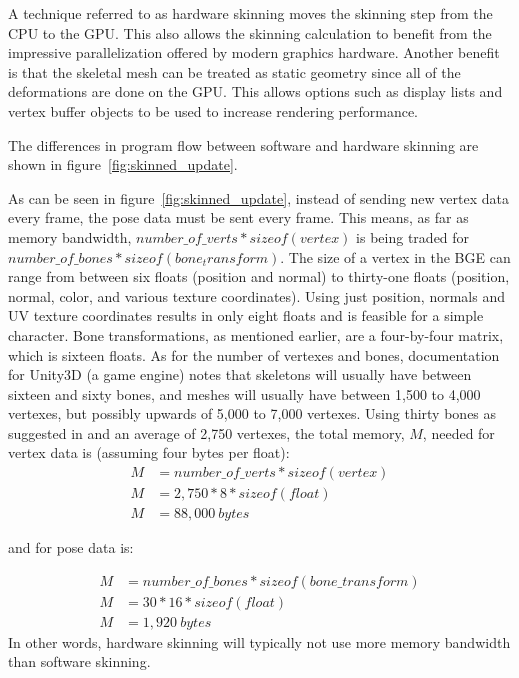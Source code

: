 A technique referred to as hardware skinning moves the skinning step from the CPU to the GPU.
This also allows the skinning calculation to benefit from the impressive parallelization offered by modern graphics hardware.
Another benefit is that the skeletal mesh can be treated as static geometry since all of the deformations are done on the GPU.
This allows options such as display lists and vertex buffer objects\cite{ARB_texture_buffer_object} to be used to increase rendering performance.

The differences in program flow between software and hardware skinning are shown in figure~\ref{fig:skinned_update}.


As can be seen in figure~\ref{fig:skinned_update}, instead of sending new vertex data every frame, the pose data must be sent every frame.
This means, as far as memory bandwidth, $number\_of\_verts*sizeof(vertex)$ is being traded for $number\_of\_bones*sizeof(bone_transform)$.
The size of a vertex in the BGE can range from between six floats (position and normal) to thirty-one floats (position, normal, color, and various texture coordinates).
Using just position, normals and UV texture coordinates results in only eight floats and is feasible for a simple character.
Bone transformations, as mentioned earlier, are a four-by-four matrix, which is sixteen floats.
As for the number of vertexes and bones, documentation for Unity3D (a game engine) notes that skeletons will usually have between sixteen and sixty bones, and meshes will usually have between 1,500 to 4,000 vertexes, but possibly upwards of 5,000 to 7,000 vertexes\cite{unity_opt_char}.
Using thirty bones as suggested in \cite{unity_opt_char} and an average of 2,750 vertexes, the total memory, $M$, needed for vertex data is (assuming four bytes per float):
\begin{align*}
 M &= number\_of\_verts*sizeof(vertex)\\
 M &= 2,750 * 8 * sizeof(float)\\
 M &= 88,000\ bytes
\end{align*}

and for pose data is:

\begin{align*}
 M &= number\_of\_bones*sizeof(bone\_transform)\\
 M &= 30 * 16 * sizeof(float)\\
 M &= 1,920\ bytes
\end{align*}
In other words, hardware skinning will typically not use more memory bandwidth than software skinning.

